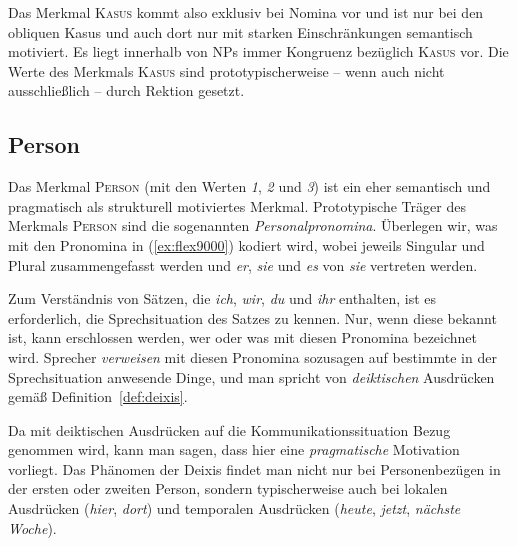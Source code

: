 Das Merkmal \textsc{Kasus} kommt also exklusiv bei Nomina vor und ist nur bei den obliquen Kasus und auch dort nur mit starken Einschränkungen semantisch motiviert.
Es liegt innerhalb von NPs immer Kongruenz bezüglich \textsc{Kasus} vor.
Die Werte des Merkmals \textsc{Kasus} sind prototypischerweise -- wenn auch nicht ausschließlich -- durch Rektion gesetzt.

\subsection{Person}

\label{sec:person}

Das Merkmal \textsc{Person} (mit den Werten \textit{1}, \textit{2} und \textit{3}) ist ein eher semantisch und pragmatisch als strukturell motiviertes Merkmal.
Prototypische Träger des Merkmals \textsc{Person} sind die sogenannten \textit{Personalpronomina}.
Überlegen wir, was mit den Pronomina in (\ref{ex:flex9000}) kodiert wird, wobei jeweils Singular und Plural zusammengefasst werden und \textit{er}, \textit{sie} und \textit{es} von \textit{sie} vertreten werden.

\begin{exe}
  \ex \label{ex:flex9000}
  \begin{xlist}
  \end{xlist}
\end{exe}


Zum Verständnis von Sätzen, die \textit{ich}, \textit{wir}, \textit{du} und \textit{ihr} enthalten, ist es erforderlich, die Sprechsituation des Satzes zu kennen.
Nur, wenn diese bekannt ist, kann erschlossen werden, wer oder was mit diesen Pronomina bezeichnet wird.
Sprecher \textit{verweisen} mit diesen Pronomina sozusagen auf bestimmte in der Sprechsituation anwesende Dinge, und man spricht von \textit{deiktischen} Ausdrücken gemäß Definition~\ref{def:deixis}.


Da mit deiktischen Ausdrücken auf die Kommunikationssituation Bezug genommen wird, kann man sagen, dass hier eine \textit{pragmatische} Motivation vorliegt.
Das Phänomen der Deixis findet man nicht nur bei Personenbezügen in der ersten oder zweiten Person, sondern typischerweise auch bei lokalen Ausdrücken (\textit{hier}, \textit{dort}) und temporalen Ausdrücken (\textit{heute}, \textit{jetzt}, \textit{nächste Woche}).

